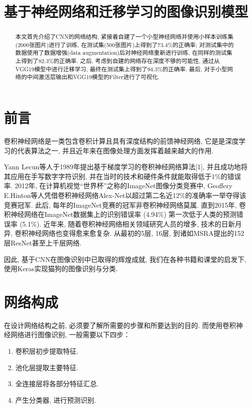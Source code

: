 \documentclass[lang=cn,11pt]{elegantpaper}
\title{基于神经网络和迁移学习的图像识别模型}
\date{}
\begin{document}
\begin{abstract}
	本文首先介绍了CNN的网络结构, 紧接着自建了一个小型神经网络并使用小样本训练集(2000张图片)进行了训练, 在测试集(500张图片)上得到了$73.4\%$的正确率; 对测试集中的数据使用了数据增强(data augmentation)后对神经网络重新进行训练, 在同样的测试集上得到了$82.3\%$的正确率. 之后, 考虑到自建的网络存在深度不够的可能性, 通过从VGG19模型中进行迁移学习, 最终在测试集上得到了$94.3\%$的正确率. 最后, 对于小型网络的中间激活层输出和VGG19模型的Filter进行了可视化. 
\end{abstract}
	
\tableofcontents
\thispagestyle{empty}
\newpage
\normalsize
{}



\section{前言}
卷积神经网络是一类包含卷积计算且具有深度结构的前馈神经网络, 它是是深度学习的代表算法之一, 并且近年来在图像处理方面发挥着越来越大的作用. 

Yann Lecun等人于1989年提出基于梯度学习的卷积神经网络算法[1], 并且成功地将其应用在手写数字字符识别, 并在当时的技术和硬件条件就能取得低于1\%的错误率. 2012年, 在计算机视觉“世界杯”之称的ImageNet图像分类竞赛中, Geoffery E.Hinton等人凭借卷积神经网络Alex-Net以超过第二名近12\%的准确率一举夺得该竞赛冠军. 此后, 每年的ImageNet竞赛的冠军非卷积神经网络莫属. 直到2015年, 卷积神经网络在ImageNet数据集上的识别错误率 (4.94\%) 第一次低于人类的预测错误率 (5.1\%). 近年来, 随着卷积神经网络相关领域研究人员的增多, 技术的日新月异, 卷积神经网络也变得愈来愈复杂. 从最初的5层, 16层, 到诸如MSRA提出的152层ResNet甚至上千层网络. 

因此, 基于CNN在图像识别中已取得的辉煌成就, 我们在各种书籍和课堂的启发下, 使用Keras实现猫狗的图像识别与分类. 


\section{网络构成}
在设计网络结构之前, 必须要了解所需要的步骤和所要达到的目的. 而使用卷积神经网络进行图像识别, 一般需要以下四步：

\begin{enumerate}
	\item 卷积层初步提取特征.
	\item 池化层提取主要特征.
	\item 全连接层将各部分特征汇总.
	\item 产生分类器, 进行预测识别.
\end{enumerate}
\end{document}
